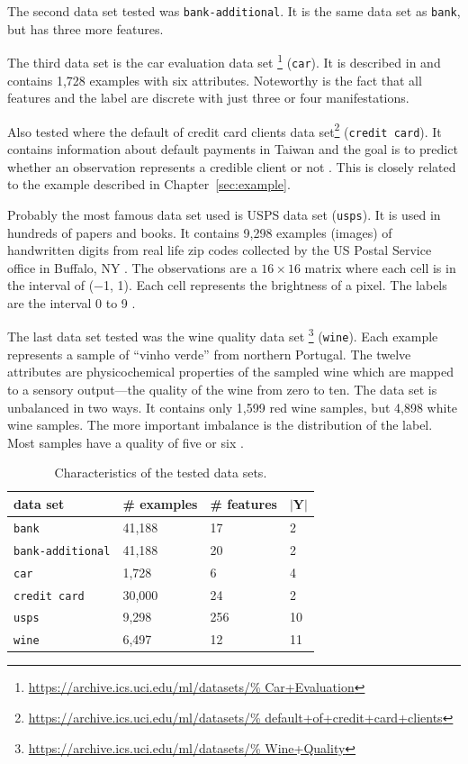 \documentclass[twoside,11pt]{article}
\def\Y{\textbf{Y}}
\begin{document}
The second data set tested was \texttt{bank-additional}.
It is the same data set as \texttt{bank}, but has three
more features.

The third data set is the car evaluation data set%
\footnote{\url{https://archive.ics.uci.edu/ml/datasets/%
  Car+Evaluation}} (\texttt{car}).
It is described in \citet{bohanec_et_al_1988} and contains
1,728 examples with six attributes. Noteworthy is the fact
that all features and the label are discrete with
just three or four manifestations.

Also tested where the default of credit card clients data
set\footnote{\url{https://archive.ics.uci.edu/ml/datasets/%
  default+of+credit+card+clients}} (\texttt{credit card}).
It contains information about default payments in Taiwan
and the goal is to predict whether an observation
represents a credible client or not
\citep[see][]{yeh_et_al_2009}.
This is closely related to the example described in
Chapter~\ref{sec:example}.

Probably the most famous data set used is USPS data set
(\texttt{usps}). It is used in hundreds of papers and
books.
It contains 9,298 examples (images) of handwritten digits
from real life zip codes collected by the US Postal Service
office in Buffalo, NY \citep[see][Appendix B.1]{alrw}.
The observations are a $16 \times 16$ matrix where each
cell is in the interval of (−1, 1).
Each cell represents the brightness of a pixel. The labels
are the interval 0 to 9
\citep[see][]{lecun_et_al_1989, fassbender_2019}.

The last data set tested was the wine quality data set%
\footnote{\url{https://archive.ics.uci.edu/ml/datasets/%
  Wine+Quality}} (\texttt{wine}).
Each example represents a sample of ``vinho verde'' from
northern Portugal.
The twelve attributes are physicochemical properties of the
sampled wine which are mapped to a sensory output---the
quality of the wine from zero to ten.
The data set is unbalanced in two ways. It contains only
1,599 red wine samples, but 4,898 white wine samples.
The more important imbalance is the distribution of the
label. Most samples have a quality of five or six
\citep[see][]{cortez_et_al_2009}.

\begin{table}
  \begin{center}
  \begin{tabu}{llll}
    data set &\# examples &\# features &$|\Y|$ \\ \hline
    \texttt{bank} &41,188 &17 &2 \\
    \texttt{bank-additional} &41,188 &20 &2 \\
    \texttt{car} &1,728 &6 &4 \\
    \texttt{credit card} &30,000 &24 &2 \\
    \texttt{usps} &9,298 &256 &10 \\
    \texttt{wine} &6,497 &12 &11 \\
  \end{tabu}
  \end{center}
  \caption{Characteristics of the tested data sets.}
\end{table}
\end{document}
